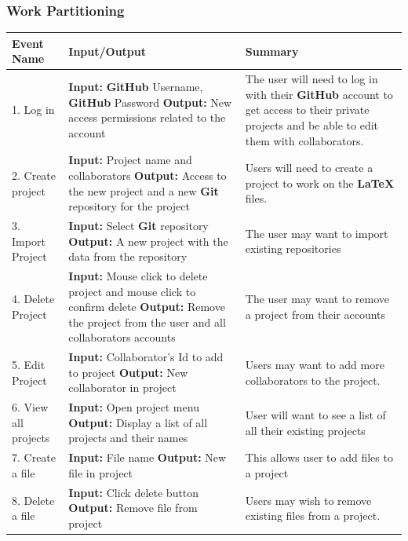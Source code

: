 \documentclass[12pt, titlepage]{article}
\begin{document}
	\subsubsection{Work Partitioning}
	
	\begin{longtable}{|p{4cm}|p{5cm}|p{5cm}|}
		\hline
		\textbf{Event Name} & \textbf{Input/Output} & \textbf{Summary} \\
		\hline
		1. Log in & \textbf{Input:} \textbf{GitHub} Username, \textbf{GitHub} Password \newline \textbf{Output:} New access permissions related to the account & The user will need to log in with their \textbf{GitHub} account to get access to their private projects and be able to edit them with collaborators.\\
		\hline
		2. Create project & \textbf{Input:} Project name and collaborators \newline \textbf{Output:} Access to the new project and a new \textbf{Git} repository for the project & Users will need to create a project to work on the \textbf{LaTeX} files.\\
		\hline
		3. Import Project & \textbf{Input:} Select \textbf{Git} repository \newline \textbf{Output:} A new project with the data from the repository & The user may want to import existing repositories\\
		\hline
		4. Delete Project & \textbf{Input:} Mouse click to delete project and mouse click to confirm delete \newline \textbf{Output:} Remove the project from the user and all collaborators accounts & The user may want to remove a project from their accounts\\
		\hline
		5. Edit Project & \textbf{Input:} Collaborator's Id to add to project \newline \textbf{Output:} New collaborator in project & Users may want to add more collaborators to the project.\\
		\hline
		6. View all projects & \textbf{Input:} Open project menu \newline \textbf{Output:} Display a list of all projects and their names & User will want to see a list of all their existing projects\\
		\hline
		7. Create a file & \textbf{Input:} File name \newline \textbf{Output:} New file in project & This allows user to add files to a project\\
		\hline
		8. Delete a file & \textbf{Input:} Click delete button  \newline \textbf{Output:} Remove file from project &  Users may wish to remove existing files from a project.\\

\end{longtable}
\end{document}
